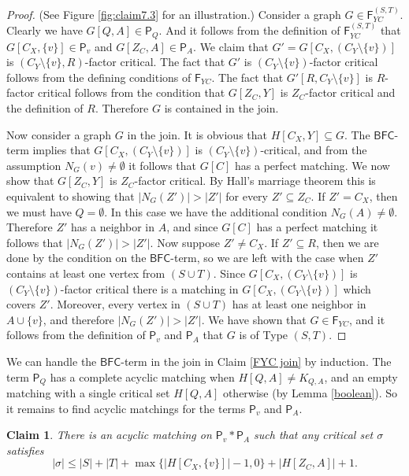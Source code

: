 \documentclass[10pt]{amsart}
\newtheorem{claim}[thm]{Claim}
\theoremstyle{definition}
\begin{document}
	\begin{proof}
		(See Figure \ref{fig:claim7.3} for an illustration.) Consider a graph $G\in \mathsf{F}_{YC}^{(S,T)}$. Clearly we have $G[Q,A]\in \mathsf{P}_Q$. And it follows from the definition of $\mathsf{F}_{YC}^{(S,T)}$ that $G[C_X, \{v\}]\in \mathsf{P}_v$ and $G[Z_C, A]\in \mathsf{P}_A$. 
		We claim that $G' = G[C_X, (C_Y\setminus \{v\})]$ is $(C_Y\setminus\{v\}, R)$-factor critical. 
		The fact that $G'$ is $(C_Y\setminus\{v\})$-factor critical follows from the defining conditions of $\mathsf{F}_{YC}$. 
		The fact that $G'[R,C_Y\setminus \{v\}]$ is $R$-factor critical follows from the condition that $G[Z_C, Y]$ is $Z_C$-factor critical and the definition of $R$. Therefore $G$ is contained in the join. 
		
		Now consider a graph $G$ in the join. It is obvious that $H[C_X, Y]\subseteq G$. 
		The $\mathsf{BFC}$-term implies that $G[C_X, (C_Y\setminus\{v\})]$ is $(C_Y\setminus\{v\})$-critical, 
		and from the assumption $N_G(v)\neq\emptyset$ it follows that $G[C]$ has a perfect matching. 
		We now show that $G[Z_C, Y]$ is $Z_C$-factor critical. By Hall's marriage theorem this is equivalent to showing that $|N_G(Z')| > |Z'|$ for every $Z'\subseteq Z_C$.
		If $Z' = C_X$, then we must have $Q = \emptyset$. 
		In this case we have the additional condition $N_G(A)\neq \emptyset$. 
		Therefore $Z'$ has a neighbor in $A$, 
		and since $G[C]$ has a perfect matching it follows that $|N_G(Z')| > |Z'|$. 
		Now suppose $Z'\neq C_X$. If $Z'\subseteq R$, then we are done by the condition on the $\mathsf{BFC}$-term, so we are left with the case when $Z'$ contains at least one vertex from $(S\cup T)$. Since $G[C_X,(C_Y\setminus\{v\})]$ is $(C_Y\setminus \{v\})$-factor critical there is a matching in $G[C_X,(C_Y\setminus \{v\})]$ which covers $Z'$. Moreover, every vertex in $(S\cup T)$ has at least one neighbor in $A\cup \{v\}$, and therefore $|N_G(Z')|>|Z'|$. We have shown that $G\in \mathsf{F}_{YC}$, and it follows from the definition of $\mathsf{P}_v$ and $\mathsf{P}_A$ that $G$ is of Type $(S,T)$.
	\end{proof}
	
	We can handle the $\mathsf{BFC}$-term in the join in Claim \ref{FYC join} by induction. The term $\mathsf{P}_Q$ has a complete acyclic matching when $H[Q,A]\ne K_{Q,A}$, and an empty matching with a single critical set $H[Q,A]$ otherwise (by Lemma \ref{boolean}). So it remains to find acyclic matchings for the terms $\mathsf{P}_v$ and $\mathsf{P}_A$.
	
	\begin{claim} \label{size ST}
		There is an acyclic matching on $\mathsf{P}_v *  \mathsf{P}_A$ such that any critical set $\sigma$ satisfies
		\[|\sigma| \leq |S| + |T| + \max\{|H[C_X, \{v\}]|-1, 0\} + |H[Z_C, A]| +1. \]
	\end{claim}
	
\end{document}
